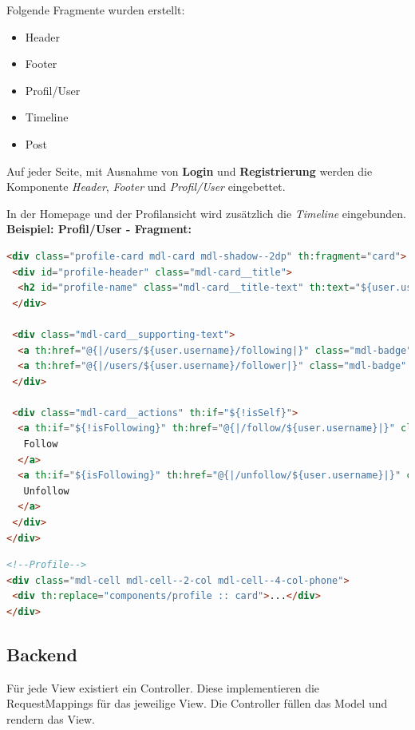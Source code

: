 \documentclass[
    a4paper
]{scrreprt}
\begin{document}
	Folgende Fragmente wurden erstellt:
	\begin{itemize} 
		\item Header
		\item Footer
		\item Profil/User
		\item Timeline
		\item Post
	\end{itemize}

	Auf jeder Seite, mit Ausnahme von \textbf{Login} und \textbf{Registrierung} werden die Komponente \textit{Header}, \textit{Footer} und \textit{Profil/User} eingebettet.
	
	In der Homepage und der Profilansicht wird zusätzlich die \textit{Timeline} eingebunden.\\
	
	\textbf{Beispiel: Profil/User - Fragment:}
	\begin{lstlisting}[language=html]
<div class="profile-card mdl-card mdl-shadow--2dp" th:fragment="card">
 <div id="profile-header" class="mdl-card__title">
  <h2 id="profile-name" class="mdl-card__title-text" th:text="${user.username}"></h2>
 </div>
		
 <div class="mdl-card__supporting-text">
  <a th:href="@{|/users/${user.username}/following|}" class="mdl-badge" th:attr="data-badge=${followingCnt}">Following</a>
  <a th:href="@{|/users/${user.username}/follower|}" class="mdl-badge" th:attr="data-badge=${followerCnt}">Follower</a>
 </div>
		
 <div class="mdl-card__actions" th:if="${!isSelf}">
  <a th:if="${!isFollowing}" th:href="@{|/follow/${user.username}|}" class="mdl-button mdl-button--raised mdl-button--colored mdl-js-button mdl-js-ripple-effect" style="width: 100%;">
   Follow
  </a>
  <a th:if="${isFollowing}" th:href="@{|/unfollow/${user.username}|}" class="warn mdl-button mdl-button--raised mdl-js-button mdl-js-ripple-effect" style="width: 100%;">
   Unfollow
  </a>
 </div>
</div>
	\end{lstlisting}
	\begin{lstlisting}[language=html]
<!--Profile-->
<div class="mdl-cell mdl-cell--2-col mdl-cell--4-col-phone">
 <div th:replace="components/profile :: card">...</div>
</div>
	\end{lstlisting}

    \subsection{Backend}
	Für jede View existiert ein Controller. Diese implementieren die RequestMappings für das jeweilige View. Die Controller füllen das Model und rendern das View.
	
\end{document}
